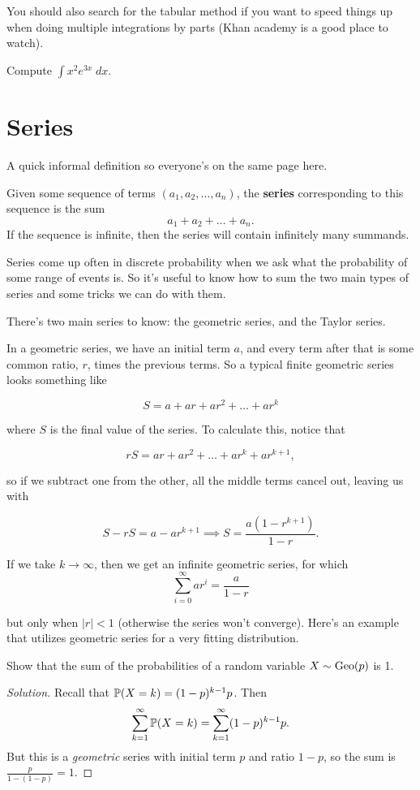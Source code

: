 \documentclass[11 pt]{scrartcl}
\begin{document}
You should also search for the tabular method if you want to speed things up when doing multiple integrations by parts (Khan academy is a good place to watch). 

\begin{exercise}
    Compute $\int x^2e^{3x}\; dx$. 
\end{exercise}

\section{Series}
A quick informal definition so everyone's on the same page here. 

\begin{definition}[Series]
    Given some sequence of terms $(a_1, a_2, \dots, a_n)$, the \textbf{series} corresponding to this sequence is the sum 
    \[ a_1 + a_2 + \dots + a_n.\] 
    If the sequence is infinite, then the series will contain infinitely many summands. 
\end{definition}

Series come up often in discrete probability when we ask what the probability of some range of events is. So it's useful to know how to sum the two main types of series and some tricks we can do with them. 

There's two main series to know: the geometric series, and the Taylor series.

In a geometric series, we have an initial term $a$, and every term after that is some common ratio, $r$, times the previous terms. So a typical finite geometric series looks something like 

\[ S = a + ar + ar^2 + \dots + ar^k\] 

where $S$ is the final value of the series. To calculate this, notice that 

\[ rS = ar + ar^2 + \dots + ar^k + ar^{k+1},\] 

so if we subtract one from the other, all the middle terms cancel out, leaving us with 

\[ S - rS = a - ar^{k+1} \implies \boxed{S = \dfrac{a(1-r^{k+1})}{1-r}}.\] 


If we take $k \to \infty$, then we get an infinite geometric series, for which 
\[ \sum_{i=0}^\infty ar^i = \dfrac{a}{1-r}\] 

but only when $|r| < 1$ (otherwise the series won't converge). Here's an example that utilizes geometric series for a very fitting distribution.
\begin{example}
    Show that the sum of the probabilities of a random variable $X \sim \text{Geo}(p)$ is 1. 
\end{example}
\begin{proof}[Solution]
    Recall that $\mathbb P(X = k) = (1-p)^{k-1} p$. Then 
    \[ \sum_{k=1}^\infty \mathbb P(X=k) = \sum_{k=1}^\infty (1-p)^{k-1} p.\] 
    But this is a \emph{geometric} series with initial term $p$ and ratio $1-p$, so the sum is $\frac{p}{1-(1-p)} = 1$. 
\end{proof}
\end{document}
